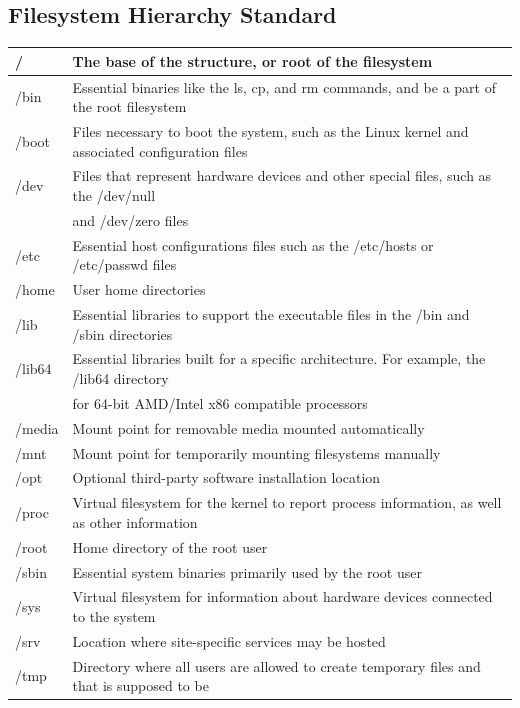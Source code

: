 \documentclass[10pt]{article}
\begin{document}
\subsection{Filesystem Hierarchy Standard}
\begin{center}
	\begin{tabular}{|l|l|}
		\hline/				&The base of the structure, or root of the filesystem
		\\ \hline/bin		&Essential binaries like the ls, cp, and rm commands, and be a part of the root filesystem
		\\ \hline/boot		&Files necessary to boot the system, such as the Linux kernel and associated configuration files
		\\ \hline/dev		&Files that represent hardware devices and other special files, such as the /dev/null\\
							& and /dev/zero files
		\\ \hline/etc		&Essential host configurations files such as the /etc/hosts or /etc/passwd files
		\\ \hline/home		&User home directories
		\\ \hline/lib		&Essential libraries to support the executable files in the /bin and /sbin directories
		\\ \hline/lib64		&Essential libraries built for a specific architecture. For example, the /lib64 directory \\
							&for 64-bit AMD/Intel x86 compatible processors
		\\ \hline/media		&Mount point for removable media mounted automatically
		\\ \hline/mnt		&Mount point for temporarily mounting filesystems manually
		\\ \hline/opt		&Optional third-party software installation location
		\\ \hline/proc		&Virtual filesystem for the kernel to report process information, as well as other information
		\\ \hline/root		&Home directory of the root user
		\\ \hline/sbin		&Essential system binaries primarily used by the root user
		\\ \hline/sys		&Virtual filesystem for information about hardware devices connected to the system
		\\ \hline/srv		&Location where site-specific services may be hosted
		\\ \hline/tmp		&Directory where all users are allowed to create temporary files and that is supposed to be\\

\end{tabular}
\end{center}
\end{document}
